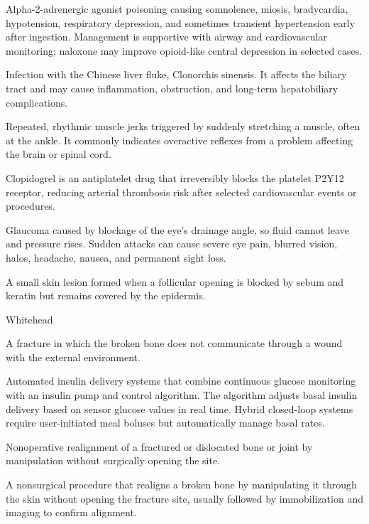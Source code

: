  Alpha-2-adrenergic agonist poisoning causing somnolence, miosis, bradycardia, hypotension, respiratory depression, and sometimes transient hypertension early after ingestion. Management is supportive with airway and cardiovascular monitoring; naloxone may improve opioid-like central depression in selected cases.

 Infection with the Chinese liver fluke, Clonorchis sinensis. It affects the biliary
tract and may cause inflammation, obstruction, and long-term hepatobiliary
complications.

 Repeated, rhythmic muscle jerks triggered by suddenly stretching a muscle, often at the ankle. It commonly indicates overactive reflexes from a problem affecting the brain or spinal cord.

 Clopidogrel is an antiplatelet drug that irreversibly blocks the platelet P2Y12 receptor, reducing arterial thrombosis risk after selected cardiovascular events or procedures.

 Glaucoma caused by blockage of the eye's drainage angle, so fluid cannot leave and pressure rises. Sudden attacks can cause severe eye pain, blurred vision, halos, headache, nausea, and permanent sight loss.

 A small skin lesion formed when a follicular opening is blocked by sebum and keratin but
remains covered by the epidermis.

\synonyms
Whitehead

 A fracture in which the broken bone does not communicate through a wound with the
external environment.

 Automated insulin delivery systems that combine continuous glucose monitoring with an
insulin pump and control algorithm. The algorithm adjusts basal insulin delivery based
on sensor glucose values in real time. Hybrid closed-loop systems require user-initiated
meal boluses but automatically manage basal rates.

 Nonoperative realignment of a fractured or dislocated bone or joint by manipulation
without surgically opening the site.

 A nonsurgical procedure that realigns a broken bone by manipulating it through the skin without opening the fracture site, usually followed by immobilization and imaging to confirm alignment.

